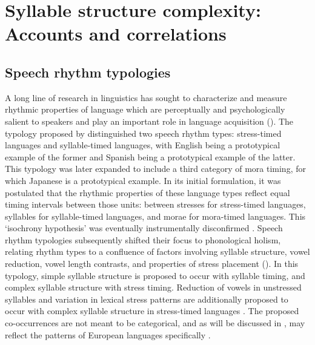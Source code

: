\section{Syllable structure complexity: Accounts and correlations}\label{sec:1.3}
\subsection{Speech rhythm typologies}\label{sec:1.3.1}

  A long line of research in linguistics has sought to characterize and measure rhythmic properties of language which are perceptually and psychologically sa\-lient to speakers and play an important role in language acquisition (\citealt{CutlerMehler1993}). The typology proposed by \citet{Pike1945} distinguished two speech rhythm types: stress-timed languages and syllable-timed languages, with English being a prototypical example of the former and Spanish being a prototypical example of the latter. This typology was later expanded to include a third category of mora timing, for which Japanese is a prototypical example. In its initial formulation, it was postulated that the rhythmic properties of these language types reflect equal timing intervals between those units: between stresses for stress-timed languages, syllables for syllable-timed languages, and morae for mora-timed languages. This ‘isochrony hypothesis’ was eventually instrumentally disconfirmed \citep{Roach1982}. Speech rhythm typologies subsequently shifted their  focus to phonological holism, relating rhythm types to a confluence of factors involving syllable structure, vowel reduction, vowel length contrasts, and properties of stress placement (\citealt{Roach1982,Dauer1983}). In this typology, simple syllable structure is proposed to occur with syllable timing, and complex syllable structure with stress timing. Reduction of vowels in unstressed syllables and variation in lexical stress patterns are additionally proposed to occur with complex syllable structure in stress-timed languages \citep{Auer1993}. The proposed co-occurrences are not meant to be categorical, and as will be discussed in , may reflect the patterns of European languages specifically \citep{Schiering2007}.

